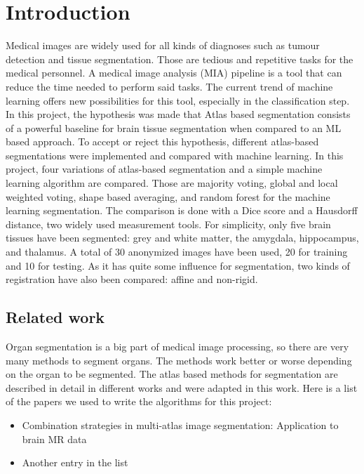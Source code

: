 \section*{Introduction}
Medical images are widely used for all kinds of diagnoses such as tumour detection and tissue segmentation. Those are tedious and repetitive tasks for the medical personnel. A medical image analysis (MIA) pipeline is a tool that can reduce the time needed to perform said tasks. The current trend of machine learning offers new possibilities for this tool, especially in the classification step.
In this project, the hypothesis was made that Atlas based segmentation consists of a powerful baseline for brain tissue segmentation when compared to an ML based approach. To accept or reject this hypothesis, different atlas-based segmentations were implemented and compared with machine learning.
In this project, four variations of atlas-based segmentation and a simple machine learning algorithm are compared. Those are majority voting, global and local weighted voting, shape based averaging, and random forest for the machine learning segmentation. The comparison is done with a Dice score and a Hausdorff distance, two widely used measurement tools. For simplicity, only five brain tissues have been segmented: grey and white matter, the amygdala, hippocampus, and thalamus. A total of 30 anonymized images have been used, 20 for training and 10 for testing. As it has quite some influence for segmentation, two kinds of registration have also been compared: affine and non-rigid.

\subsection*{Related work}
Organ segmentation is a big part of medical image processing, so there are very many methods to segment organs. The methods work better or worse depending on the organ to be segmented. The atlas based methods for segmentation are described in detail in different works and were adapted in this work. Here is a list of the papers we used to write the algorithms for this project:

\begin{itemize}
	\item Combination strategies in multi-atlas image segmentation: Application to brain MR data\cite{b2}
	\item Another entry in the list
\end{itemize}


